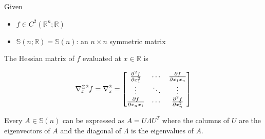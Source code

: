 \begin{definition}
    
    Given
    \begin{itemize}
        \item $f\in C^2(\mathbb{R}^n;\mathbb{R})$
        \item $\mathbb{S}(n;\mathbb{R}) = \mathbb{S}(n)$: an $n\times n$ symmetric matrix
    \end{itemize}

    The Hessian matrix of $f$ evaluated at $x \in \mathbb{R}$ is

    \begin{equation}
        \nabla^{\otimes 2}_x f = \nabla^2_x = \begin{bmatrix}
            \pdv[2]{f}{x_1} & \cdots & \pdv{f}{x_1x_n} \\
            \vdots & \ddots & \vdots \\
            \pdv{f}{x_nx_1} & \cdots & \pdv[2]{f}{x_n}
        \end{bmatrix}
    \end{equation}

    \begin{remark}
        Every $A\in \mathbb{S}(n)$ can be expressed as $A = U\Lambda U^T$ where the columns of $U$ are the eigenvectors of $A$ and the diagonal of $\Lambda$ is the eigenvalues of $A$.
    \end{remark}
\end{definition}